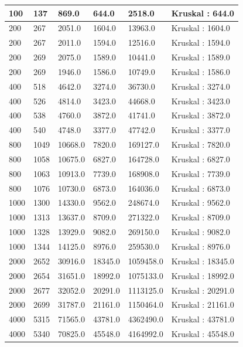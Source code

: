 \begin{longtable}[H]{|p{1.5cm}|p{1.5cm}|p{2cm}|p{2cm}|p{3cm}|p{3cm}|}
    100 & 137 & 869.0 & 644.0 & 2518.0 & Kruskal : 644.0 \\ \hline
    200 & 267 & 2051.0 & 1604.0 & 13963.0 & Kruskal : 1604.0 \\ \hline 
    200 & 267 & 2011.0 & 1594.0 & 12516.0 & Kruskal : 1594.0 \\ \hline 
    200 & 269 & 2075.0 & 1589.0 & 10441.0 & Kruskal : 1589.0 \\ \hline 
    200 & 269 & 1946.0 & 1586.0 & 10749.0 & Kruskal : 1586.0 \\ \hline 
    400 & 518 & 4642.0 & 3274.0 & 36730.0 & Kruskal : 3274.0 \\ \hline 
    400 & 526 & 4814.0 & 3423.0 & 44668.0 & Kruskal : 3423.0 \\ \hline 
    400 & 538 & 4760.0 & 3872.0 & 41741.0 & Kruskal : 3872.0 \\ \hline 
    400 & 540 & 4748.0 & 3377.0 & 47742.0 & Kruskal : 3377.0 \\ \hline 
    800 & 1049 & 10668.0 & 7820.0 & 169127.0 & Kruskal : 7820.0 \\ \hline
    800 & 1058 & 10675.0 & 6827.0 & 164728.0 & Kruskal : 6827.0 \\ \hline
    800 & 1063 & 10913.0 & 7739.0 & 168908.0 & Kruskal : 7739.0 \\ \hline
    800 & 1076 & 10730.0 & 6873.0 & 164036.0 & Kruskal : 6873.0 \\ \hline
    1000 & 1300 & 14330.0 & 9562.0 & 248674.0 & Kruskal : 9562.0 \\ \hline
    1000 & 1313 & 13637.0 & 8709.0 & 271322.0 & Kruskal : 8709.0 \\ \hline
    1000 & 1328 & 13929.0 & 9082.0 & 269150.0 & Kruskal : 9082.0 \\ \hline
    1000 & 1344 & 14125.0 & 8976.0 & 259530.0 & Kruskal : 8976.0 \\ \hline
    2000 & 2652 & 30916.0 & 18345.0 & 1059458.0 & Kruskal : 18345.0 \\ \hline 
    2000 & 2654 & 31651.0 & 18992.0 & 1075133.0 & Kruskal : 18992.0 \\ \hline 
    2000 & 2677 & 32052.0 & 20291.0 & 1113125.0 & Kruskal : 20291.0 \\ \hline 
    2000 & 2699 & 31787.0 & 21161.0 & 1150464.0 & Kruskal : 21161.0 \\ \hline 
    4000 & 5315 & 71565.0 & 43781.0 & 4362490.0 & Kruskal : 43781.0 \\ \hline 
    4000 & 5340 & 70825.0 & 45548.0 & 4164992.0 & Kruskal : 45548.0 \\ \hline 

\end{longtable}
